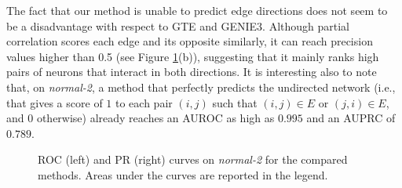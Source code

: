 \documentclass[wcp]{jmlr}
\begin{document}
The fact that our method is unable to predict edge directions does not seem to
be a disadvantage with respect to GTE and GENIE3. Although partial correlation
scores each edge and its opposite similarly, it can reach precision values
higher than 0.5 (see Figure \ref{fig:curves}(b)), suggesting that it mainly ranks high
pairs of neurons that interact in both directions.  It is interesting also to
note that, on \textit{normal-2}, a method that perfectly predicts the
undirected network (i.e., that gives a score of $1$ to each pair $(i,j)$ such that
$(i,j)\in E$ or $(j,i)\in E$, and $0$ otherwise) already reaches an AUROC as high
as $0.995$ and an AUPRC of $0.789$.



\begin{figure}[t]
\centering
{}
\caption{ROC (left) and PR (right) curves on \textit{normal-2} for the compared methods. Areas under the curves are reported in the legend.}
\label{fig:curves}
\end{figure}
\end{document}
